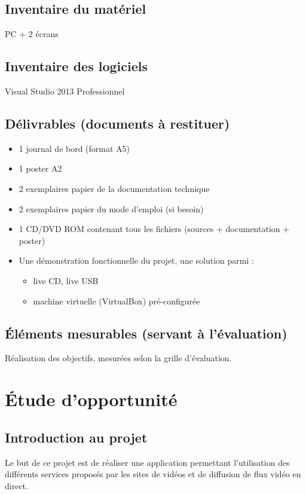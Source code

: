 \documentclass[11pt]{report} %
\begin{document}
	\section{Inventaire du matériel}
	PC + 2 écrans

	\section{Inventaire des logiciels}
	Visual Studio 2013 Professionnel
	
	\section{Délivrables (documents à restituer)}
	\begin{itemize}
		\item 1 journal de bord (format A5)
		\item 1 poster A2
		\item 2 exemplaires papier de la documentation technique
		\item 2 exemplaires papier du mode d'emploi (si besoin)
		\item 1 CD/DVD ROM contenant tous les fichiers (sources + documentation + poster)
		\item Une démonstration fonctionnelle du projet, une solution parmi :
		\begin{itemize}
			\item live CD, live USB
			\item machine virtuelle (VirtualBox) pré-configurée
		\end{itemize}
	\end{itemize}

	\section{Éléments mesurables (servant à l'évaluation)}
	Réalisation des objectifs, mesurées selon la grille d'évaluation.

\chapter{Étude d'opportunité}
	\section{Introduction au projet}
	Le but de ce projet est de réaliser une application permettant l'utilisation des différents services proposés par les sites de vidéos et de diffusion de flux vidéo en direct.
\end{document}
